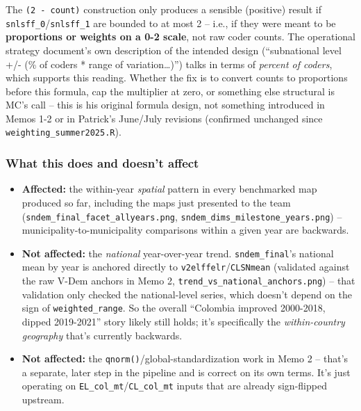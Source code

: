 \documentclass[
]{article}
\providecommand{\tightlist}{%
  \setlength{\itemsep}{0pt}\setlength{\parskip}{0pt}}
\begin{document}
The \texttt{(2\ -\ count)} construction only produces a sensible
(positive) result if \texttt{snlsff\_0}/\texttt{snlsff\_1} are bounded
to at most 2 -- i.e., if they were meant to be \textbf{proportions or
weights on a 0-2 scale}, not raw coder counts. The operational strategy
document's own description of the intended design (``subnational level
+/- (\% of coders * range of variation\ldots)'') talks in terms of
\emph{percent of coders}, which supports this reading. Whether the fix
is to convert counts to proportions before this formula, cap the
multiplier at zero, or something else structural is MC's call -- this is
his original formula design, not something introduced in Memos 1-2 or in
Patrick's June/July revisions (confirmed unchanged since
\texttt{weighting\_summer2025.R}).

\hypertarget{what-this-does-and-doesnt-affect}{%
\subsubsection{What this does and doesn't
affect}\label{what-this-does-and-doesnt-affect}}

\begin{itemize}
\tightlist
\item
  \textbf{Affected:} the within-year \emph{spatial} pattern in every
  benchmarked map produced so far, including the maps just presented to
  the team (\texttt{sndem\_final\_facet\_allyears.png},
  \texttt{sndem\_dims\_milestone\_years.png}) --
  municipality-to-municipality comparisons within a given year are
  backwards.
\item
  \textbf{Not affected:} the \emph{national} year-over-year trend.
  \texttt{sndem\_final}'s national mean by year is anchored directly to
  \texttt{v2elffelr}/\texttt{CLSNmean} (validated against the raw V-Dem
  anchors in Memo 2, \texttt{trend\_vs\_national\_anchors.png}) -- that
  validation only checked the national-level series, which doesn't
  depend on the sign of \texttt{weighted\_range}. So the overall
  ``Colombia improved 2000-2018, dipped 2019-2021'' story likely still
  holds; it's specifically the \emph{within-country geography} that's
  currently backwards.
\item
  \textbf{Not affected:} the \texttt{qnorm()}/global-standardization
  work in Memo 2 -- that's a separate, later step in the pipeline and is
  correct on its own terms. It's just operating on
  \texttt{EL\_col\_mt}/\texttt{CL\_col\_mt} inputs that are already
  sign-flipped upstream.
\end{itemize}
\end{document}
